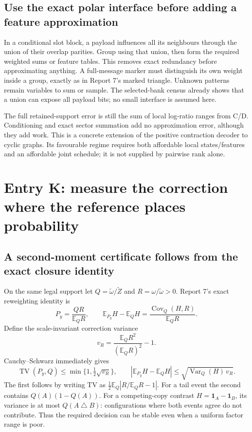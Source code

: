 \documentclass[10pt,a4paper]{article}
\newcommand{\E}{\mathbb E}
\newcommand{\ind}{\mathbf 1}
\newcommand{\TV}{\operatorname{TV}}
\begin{document}
\subsection{Use the exact polar interface before adding a feature approximation}
In a conditional slot block, a payload influences all its neighbours through the union of their overlap
parities. Group using that union, then form the required weighted sums or feature tables. This removes
exact redundancy before approximating anything. A full-message marker must distinguish its own weight
inside a group, exactly as in Report 7's marked triangle. Unknown patterns remain variables to sum or sample.
The selected-bank census already shows that a union can expose all payload bits; no small interface is
assumed here.

The full retained-support error is still the sum of local log-ratio ranges from C/D. Conditioning and exact
sector summation add no approximation error, although they add work. This is a concrete extension of the
positive contraction decoder to cyclic graphs. Its favourable regime requires both affordable local
states/features and an affordable joint schedule; it is not supplied by pairwise rank alone.

\section{Entry K: measure the correction where the reference places probability}
\label{sec:weighted-corrections}
\subsection{A second-moment certificate follows from the exact closure identity}
On the same legal support let $Q=\widetilde\omega/\widetilde Z$ and
$R=\omega/\widetilde\omega>0$. Report 7's exact reweighting identity is
\[
 P_y=\frac{QR}{\E_QR},\qquad
 \E_{P_y}H-\E_QH=\frac{\operatorname{Cov}_Q(H,R)}{\E_QR}.
\]
Define the scale-invariant correction variance
\[
 v_R=\frac{\E_QR^2}{(\E_QR)^2}-1.
\]
Cauchy--Schwarz immediately gives
\begin{equation}
 \TV(P_y,Q)\leq\min\{1,\tfrac12\sqrt{v_R}\},\qquad
 |\E_{P_y}H-\E_QH|\leq\sqrt{\operatorname{Var}_Q(H)\,v_R}.
 \label{eq:weighted-correction-bound}
\end{equation}
The first follows by writing TV as $\frac12\E_Q|R/\E_QR-1|$.
For a tail event the second contains $Q(A)(1-Q(A))$. For a competing-copy contrast
$H=\ind_A-\ind_B$, its variance is at most $Q(A\mathbin\triangle B)$: configurations where both events
agree do not contribute. Thus the required decision can be stable even when a uniform factor range is poor.
\end{document}
